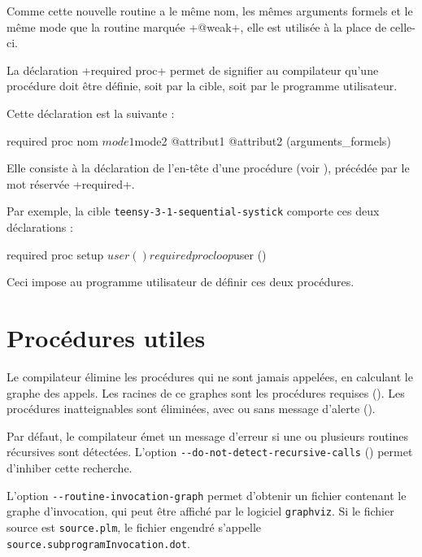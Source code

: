 
Comme cette nouvelle routine a le même nom, les mêmes arguments formels et le même mode que la routine marquée \plm+@weak+, elle est utilisée à la place de celle-ci.







La déclaration \plm+required proc+ permet de signifier au compilateur qu'une procédure doit être définie, soit par la cible, soit par le programme utilisateur.

Cette déclaration est la suivante :
\begin{PLM}
required proc nom $mode1 $mode2 @attribut1 @attribut2 (arguments_formels)
\end{PLM}

Elle consiste à la déclaration de l'en-tête d'une procédure (voir ), précédée par le mot réservée \plm+required+.

Par exemple, la cible \texttt{teensy-3-1-sequential-systick} comporte ces deux déclarations :

\begin{PLM}
required proc setup $user ()
required proc loop $user ()
\end{PLM}

Ceci impose au programme utilisateur de définir ces deux procédures.









\section{Procédures utiles}

Le compilateur élimine les procédures qui ne sont jamais appelées, en calculant le graphe des appels. Les racines de ce graphes sont les procédures requises (). Les procédures inatteignables sont éliminées, avec ou sans message d'alerte ().












Par défaut, le compilateur émet un message d'erreur si une ou plusieurs routines récursives sont détectées. L'option \texttt{-{}-do-not-detect-recursive-calls} () permet d'inhiber cette recherche.

L'option \texttt{-{}-routine-invocation-graph} permet d'obtenir un fichier contenant le graphe d'invocation, qui peut être affiché par le logiciel \texttt{graphviz}. Si le fichier source est \texttt{source.plm}, le fichier engendré s'appelle \texttt{source.subprogramInvocation.dot}.

